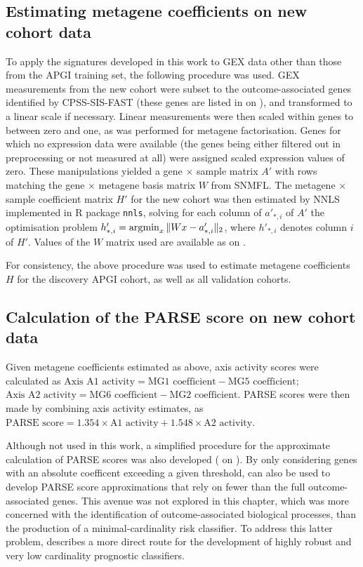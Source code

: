 \documentclass[dissertation.tex]{subfiles}
\begin{document}
\subsection{Estimating metagene coefficients on new cohort data}
To apply the signatures developed in this work to \gls{GEX} data other than those from the \gls{APGI} training set, the following procedure was used.  \Gls{GEX} measurements from the new cohort were subset to the  outcome-associated genes identified by \gls{CPSS}-\gls{SIS}-\gls{FAST} (these genes are listed in  on ), and transformed to a linear scale if necessary.  Linear measurements were then scaled within genes to between zero and one, as was performed for metagene factorisation.  Genes for which no expression data were available (the genes being either filtered out in preprocessing or not measured at all) were assigned scaled expression values of zero.  These manipulations yielded a gene $\times$ sample matrix $A'$ with rows matching the gene $\times$ metagene basis matrix $W$ from \gls{SNMFL}.  The metagene $\times$ sample coefficient matrix $H'$ for the new cohort was then estimated by \gls{NNLS} implemented in R package \texttt{nnls}, solving for each column of $a'_{*,i}$ of $A'$ the optimisation problem ${h'_{*,i}} = \operatorname*{\arg\!\min}_x \| W x - a'_{*,i} \|_2$, where $h'_{*,i}$ denotes column $i$ of $H'$.  Values of the $W$ matrix used are available as  on .

For consistency, the above procedure was used to estimate metagene coefficients $H$ for the discovery \gls{APGI} cohort, as well as all validation cohorts.

\subsection{Calculation of the \texorpdfstring{\acrshort{PARSE}}{PARSE} score on new cohort data}
Given metagene coefficients estimated as above, axis activity scores were calculated as $\text{Axis A1 activity} = \text{MG1 coefficient} - \text{MG5 coefficient}$; $\text{Axis A2 activity} = \text{MG6 coefficient} - \text{MG2 coefficient}$.  \gls{PARSE} scores were then made by combining axis activity estimates, as $\text{PARSE score} = 1.354 \times \text{A1 activity} + 1.548 \times \text{A2 activity}$.

Although not used in this work, a simplified procedure for the approximate calculation of \gls{PARSE} scores was also developed ( on ).  By only considering genes with an absolute  coefficent exceeding a given threshold,  can also be used to develop \gls{PARSE} score approximations that rely on fewer than the full  outcome-associated genes.  This avenue was not explored in this chapter, which was more concerned with the identification of outcome-associated biological processes, than the production of a minimal-cardinality risk classifier.  To address this latter problem,  describes a more direct route for the development of highly robust and very low cardinality prognostic classifiers.
\end{document}
